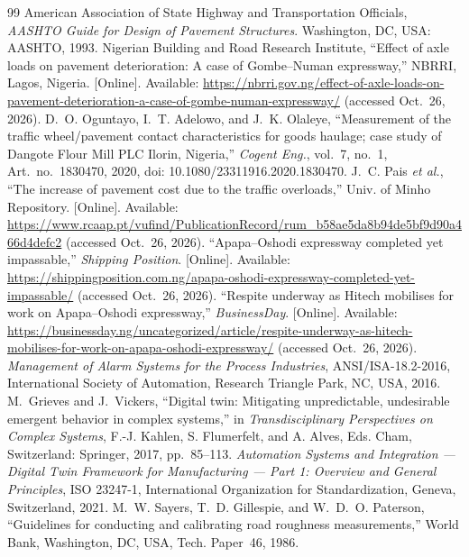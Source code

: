 \documentclass[11pt,a4paper]{article}
\begin{document}
\renewcommand{\refname}{References}
\begin{thebibliography}{99}
\small
\setlength{\itemsep}{3pt}
 American Association of State Highway and Transportation Officials, \emph{AASHTO Guide for Design of Pavement Structures}. Washington, DC, USA: AASHTO, 1993.
 Nigerian Building and Road Research Institute, ``Effect of axle loads on pavement deterioration: A case of Gombe--Numan expressway,'' NBRRI, Lagos, Nigeria. [Online]. Available: \url{https://nbrri.gov.ng/effect-of-axle-loads-on-pavement-deterioration-a-case-of-gombe-numan-expressway/} (accessed Oct.~26, 2026).
 D.~O. Oguntayo, I.~T. Adelowo, and J.~K. Olaleye, ``Measurement of the traffic wheel/pavement contact characteristics for goods haulage; case study of Dangote Flour Mill PLC Ilorin, Nigeria,'' \emph{Cogent Eng.}, vol.~7, no.~1, Art.~no.~1830470, 2020, doi: 10.1080/23311916.2020.1830470.
 J.~C. Pais \emph{et al.}, ``The increase of pavement cost due to the traffic overloads,'' Univ. of Minho Repository. [Online]. Available: \url{https://www.rcaap.pt/vufind/PublicationRecord/rum_b58ae5da8b94de5bf9d90a466d4defc2} (accessed Oct.~26, 2026).
 ``Apapa--Oshodi expressway completed yet impassable,'' \emph{Shipping Position}. [Online]. Available: \url{https://shippingposition.com.ng/apapa-oshodi-expressway-completed-yet-impassable/} (accessed Oct.~26, 2026).
 ``Respite underway as Hitech mobilises for work on Apapa--Oshodi expressway,'' \emph{BusinessDay}. [Online]. Available: \url{https://businessday.ng/uncategorized/article/respite-underway-as-hitech-mobilises-for-work-on-apapa-oshodi-expressway/} (accessed Oct.~26, 2026).
 \emph{Management of Alarm Systems for the Process Industries}, ANSI/ISA-18.2-2016, International Society of Automation, Research Triangle Park, NC, USA, 2016.
 M.~Grieves and J.~Vickers, ``Digital twin: Mitigating unpredictable, undesirable emergent behavior in complex systems,'' in \emph{Transdisciplinary Perspectives on Complex Systems}, F.-J. Kahlen, S. Flumerfelt, and A. Alves, Eds. Cham, Switzerland: Springer, 2017, pp.~85--113.
 \emph{Automation Systems and Integration --- Digital Twin Framework for Manufacturing --- Part 1: Overview and General Principles}, ISO 23247-1, International Organization for Standardization, Geneva, Switzerland, 2021.
 M.~W. Sayers, T.~D. Gillespie, and W.~D.~O. Paterson, ``Guidelines for conducting and calibrating road roughness measurements,'' World Bank, Washington, DC, USA, Tech. Paper~46, 1986.

\end{thebibliography}
\end{document}
